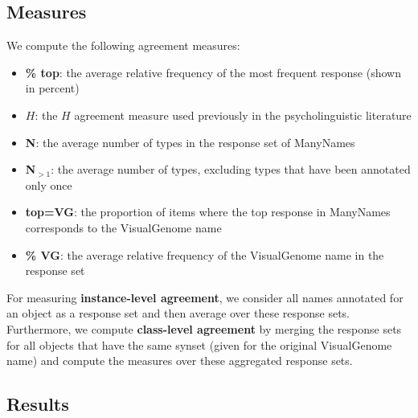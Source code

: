 \subsection{Measures}

We compute the following agreement measures:

\begin{itemize}
\item \textbf{\% top}: the average relative frequency of the most frequent response (shown in percent)
\item \textbf{$H$}: the $H$ agreement measure used previously in the psycholinguistic literature
\item \textbf{N}: the average number of types in the response set of ManyNames
\item \textbf{N$_{>1}$}: the average number of types, excluding types that have been annotated only once
\item \textbf{top=VG}: the proportion of items where the top response in ManyNames corresponds to the VisualGenome name
\item \textbf{\% VG}: the average relative frequency of the VisualGenome name in the response set

\end{itemize}

For measuring \textbf{instance-level agreement}, we consider all names annotated for an object as a response set and then average over these response sets. Furthermore, we compute \textbf{class-level agreement} by merging the response sets for all objects that have the same synset (given for the original VisualGenome name) and compute the measures over these aggregated response sets.

\subsection{Results}

